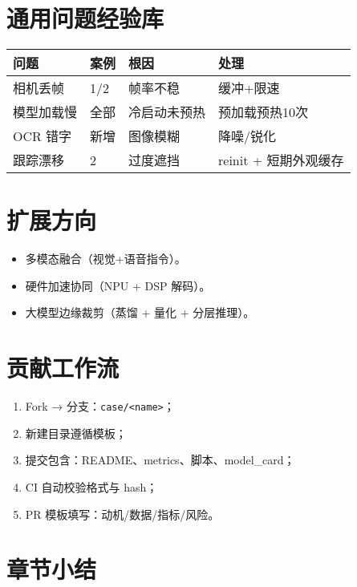 \section{通用问题经验库}\label{ux901aux7528ux95eeux9898ux7ecfux9a8cux5e93}

\begin{longtable}[]{@{}llll@{}}
\toprule\noalign{}
问题 & 案例 & 根因 & 处理 \\
\midrule\noalign{}
\endhead
\bottomrule\noalign{}
\endlastfoot
相机丢帧 & 1/2 & 帧率不稳 & 缓冲+限速 \\
模型加载慢 & 全部 & 冷启动未预热 & 预加载预热10次 \\
OCR 错字 & 新增 & 图像模糊 & 降噪/锐化 \\
跟踪漂移 & 2 & 过度遮挡 & reinit + 短期外观缓存 \\
\end{longtable}

\section{扩展方向}\label{ux6269ux5c55ux65b9ux5411}

\begin{itemize}
\tightlist
\item
  多模态融合（视觉+语音指令）。
\item
  硬件加速协同（NPU + DSP 解码）。
\item
  大模型边缘裁剪（蒸馏 + 量化 + 分层推理）。
\end{itemize}

\section{贡献工作流}\label{ux8d21ux732eux5de5ux4f5cux6d41}

\begin{enumerate}
\def\labelenumi{\arabic{enumi}.}
\tightlist
\item
  Fork → 分支：\passthrough{\lstinline!case/<name>!}；
\item
  新建目录遵循模板；
\item
  提交包含：README、metrics、脚本、model\_card；
\item
  CI 自动校验格式与 hash；
\item
  PR 模板填写：动机/数据/指标/风险。
\end{enumerate}

\section{章节小结}\label{ux7ae0ux8282ux5c0fux7ed3}

